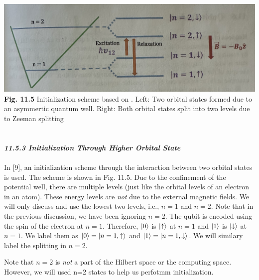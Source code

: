\documentclass{article}
\newcommand{\bfit}[1]{\textit{\textbf{#1}}}
\begin{document}
\includegraphics[scale=0.45]{Fig.11.5.jpeg}\\
\textbf{Fig. 11.5} Initialization scheme based on \cite{9friesen2004spin}. Left: Two orbital states formed due to an asymmertic
quantum well. Right: Both orbital states split into two levels due to Zeeman splitting\\\\\\
\bfit{\large 11.5.3 Initialization Through Higher Orbital State}\\\\
In [9], an initialization scheme through the interaction between two orbital states
is used. The scheme is shown in Fig. 11.5. Due to the confinement of the potential well,
there are multiple levels (just like the orbital levels of an electron in an atom). These energy
levels are \textit{not} due to the external magnetic fields. We will only discuss and use the lowest two
levels, i.e., $n=1$ and $n=2$. Note that in the previous discussion, we have been ignoring $n=2$. 
The qubit is encoded using the spin of the electron at $n=1$. Therefore, $\ket{0}$ is $\ket{\uparrow}$ at 
$n=1$ and $\ket{1}$ is $\ket{\downarrow}$ at $n=1$. We label them as $\ket{0}=\ket{n=1,\uparrow}$ and
$\ket{1}=\ket{n=1,\downarrow}$. We will similary label the splitting in $n=2$.

Note that $n=2$ is \textit{not} a part of the Hilbert space or the computing space. However, we will used n=2 states to help us
perfotmm initialization.
\end{document}
